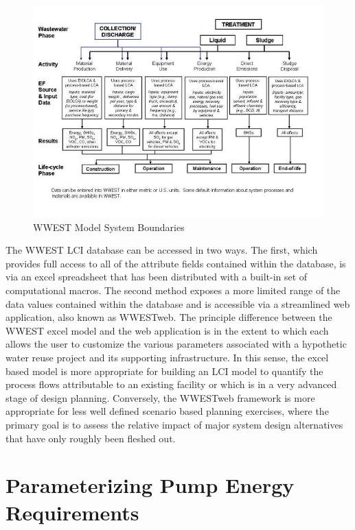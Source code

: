     \begin{figure}[!h]
        \begin{center}
        \includegraphics[width=5.5in]{figures/WWEST_System_Boundaries.jpg}
        \caption{WWEST Model System Boundaries}
        \label{fig:WWESTsystem}
        \end{center}
    \end{figure}
    
The WWEST LCI database can be accessed in two ways. The first, which provides full access to all of the attribute fields contained within the database, is via an excel spreadsheet that has been distributed with a built-in set of computational macros. The second method exposes a more limited range of the data values contained within the database and is accessible via a streamlined web application, also known as WWESTweb. The principle difference between the WWEST excel model and the web application is in the extent to which each allows the user to customize the various parameters associated with a hypothetic water reuse project and its supporting infrastructure. In this sense, the excel based model is more appropriate for building an LCI model to quantify the process flows attributable to an existing facility or which is in a very advanced stage of design planning. Conversely, the WWESTweb framework is more appropriate for less well defined scenario based planning exercises, where the primary goal is to assess the relative impact of major system design alternatives that have only roughly been fleshed out.

\section{Parameterizing Pump Energy Requirements} 

